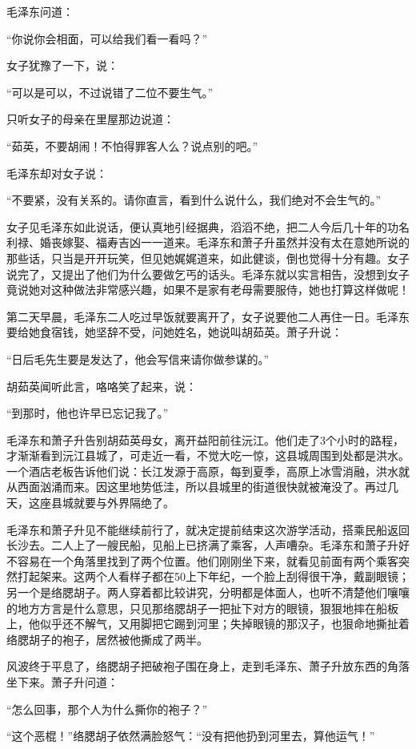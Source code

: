 \documentclass[../../dazhuan.tex]{subfiles}
\begin{document}
毛泽东问道：

“你说你会相面，可以给我们看一看吗？”

女子犹豫了一下，说：

“可以是可以，不过说错了二位不要生气。”

只听女子的母亲在里屋那边说道：

“茹英，不要胡闹！不怕得罪客人么？说点别的吧。”

毛泽东却对女子说：

“不要紧，没有关系的。请你直言，看到什么说什么，我们绝对不会生气的。”

女子见毛泽东如此说话，便认真地引经据典，滔滔不绝，把二人今后几十年的功名利禄、婚丧嫁娶、福寿吉凶一一道来。毛泽东和萧子升虽然并没有太在意她所说的那些话，只当是开开玩笑，但见她娓娓道来，如此健谈，倒也觉得十分有趣。女子说完了，又提出了他们为什么要做乞丐的话头。毛泽东就以实言相告，没想到女子竟说她对这种做法非常感兴趣，如果不是家有老母需要服侍，她也打算这样做呢！

第二天早晨，毛泽东二人吃过早饭就要离开了，女子说要他二人再住一日。毛泽东要给她食宿钱，她坚辞不受，问她姓名，她说叫胡茹英。萧子升说：

“日后毛先生要是发达了，他会写信来请你做参谋的。”

胡茹英闻听此言，咯咯笑了起来，说：

“到那时，他也许早已忘记我了。”

毛泽东和萧子升告别胡茹英母女，离开益阳前往沅江。他们走了3个小时的路程，才渐渐看到沅江县城了，可走近一看，不觉大吃一惊，这县城周围到处都是洪水。一个酒店老板告诉他们说：长江发源于高原，每到夏季，高原上冰雪消融，洪水就从西面汹涌而来。因这里地势低洼，所以县城里的街道很快就被淹没了。再过几天，这座县城就要与外界隔绝了。

毛泽东和萧子升见不能继续前行了，就决定提前结束这次游学活动，搭乘民船返回长沙去。二人上了一艘民船，见船上已挤满了乘客，人声嘈杂。毛泽东和萧子升好不容易在一个角落里找到了两个位置。他们刚刚坐下来，就看见前面有两个乘客突然打起架来。这两个人看样子都在50上下年纪，一个脸上刮得很干净，戴副眼镜；另一个是络腮胡子。两人穿着都比较讲究，分明都是体面人，也听不清楚他们嚷嚷的地方方言是什么意思，只见那络腮胡子一把扯下对方的眼镜，狠狠地摔在船板上，他似乎还不解气，又用脚把它踢到河里；失掉眼镜的那汉子，也狠命地撕扯着络腮胡子的袍子，居然被他撕成了两半。

风波终于平息了，络腮胡子把破袍子围在身上，走到毛泽东、萧子升放东西的角落坐下来。萧子升问道：

“怎么回事，那个人为什么撕你的袍子？”

“这个恶棍！”络腮胡子依然满脸怒气：“没有把他扔到河里去，算他运气！”
\end{document}
